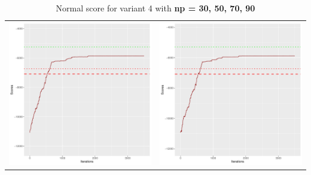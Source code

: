 \documentclass[]{scrartcl}
\begin{document}
\begin{table}[h!]
\begin{tabular}{cc}
\includegraphics[scale = 0.4]{./figs/alarm/v4/70/boundsEvolution-3502.pdf} & 
\includegraphics[scale = 0.4]{./figs/alarm/v4/90/boundsEvolution-3502.pdf} \\
\end{tabular}
\caption{Normal score for variant 4 with \textbf{np =  30, 50, 70, 90 }}
\end{table}
\end{document}
